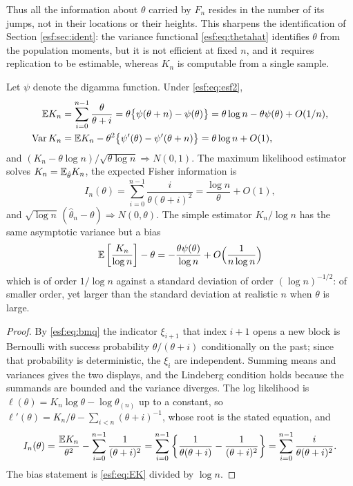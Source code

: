 Thus all the information about $\theta$ carried by $F_n$ resides in the number of its
jumps, not in their locations or their heights. This sharpens the identification of
Section \ref{esf:sec:ident}: the variance functional \eqref{esf:eq:thetahat} identifies
$\theta$ from the population moments, but it is not efficient at fixed $n$, and it
requires replication to be estimable, whereas $K_n$ is computable from a single
sample.

\begin{proposition}
\label{esf:prop:kn}
Let $\psi$ denote the digamma function. Under \eqref{esf:eq:esf2},
\begin{align}
\mathbb{E} K_n &= \sum_{i=0}^{n-1} \frac{\theta}{\theta+i}
= \theta \bigl\{ \psi(\theta+n) - \psi(\theta) \bigr\}
= \theta \log n - \theta \psi(\theta) + O(1/n), \label{esf:eq:EK} \\
\operatorname{Var} K_n &= \mathbb{E} K_n - \theta^{2} \bigl\{ \psi'(\theta) - \psi'(\theta+n) \bigr\}
= \theta \log n + O(1),
\end{align}
and $(K_n - \theta \log n)/\sqrt{\theta \log n} \Rightarrow N(0,1)$. The maximum
likelihood estimator solves $K_n = \mathbb{E}_{\hat\theta} K_n$, the expected Fisher
information is
\[
I_n(\theta) = \sum_{i=0}^{n-1} \frac{i}{\theta (\theta+i)^{2}}
= \frac{\log n}{\theta} + O(1),
\]
and $\sqrt{\log n} \, ( \hat\theta_n - \theta ) \Rightarrow N(0, \theta)$. The simple
estimator $K_n / \log n$ has the same asymptotic variance but a bias
\[
\mathbb{E} \left[ \frac{K_n}{\log n} \right] - \theta
= - \frac{\theta \psi(\theta)}{\log n} + O\Bigl( \frac{1}{n \log n} \Bigr)
\]
which is of order $1/\log n$ against a standard deviation of order $(\log n)^{-1/2}$: of smaller order, yet larger than the standard deviation at realistic $n$ when $\theta$ is large.
\end{proposition}

\begin{proof}
By \eqref{esf:eq:bmq} the indicator $\xi_{i+1}$ that index $i+1$ opens a new block is
Bernoulli with success probability $\theta/(\theta+i)$ conditionally on the past; since
that probability is deterministic, the $\xi_i$ are independent. Summing means and
variances gives the two displays, and the Lindeberg condition holds because the
summands are bounded and the variance diverges. The log likelihood is
$\ell(\theta) = K_n \log \theta - \log \theta_{(n)}$ up to a constant, so
$\ell'(\theta) = K_n/\theta - \sum_{i<n} (\theta+i)^{-1}$, whose root is the stated
equation, and
\[
I_n(\theta) = \frac{\mathbb{E} K_n}{\theta^{2}} - \sum_{i=0}^{n-1} \frac{1}{(\theta+i)^{2}}
= \sum_{i=0}^{n-1} \left\{ \frac{1}{\theta(\theta+i)} - \frac{1}{(\theta+i)^{2}} \right\}
= \sum_{i=0}^{n-1} \frac{i}{\theta(\theta+i)^{2}} .
\]
The bias statement is \eqref{esf:eq:EK} divided by $\log n$.
\end{proof}

